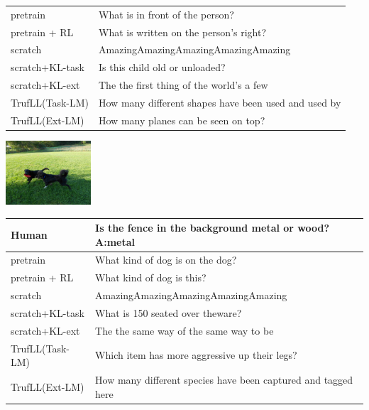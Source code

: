 \documentclass{article}
\newcommand{\algo}{TrufLL\xspace}
\begin{document}
\begin{table}[t!]
\begin{minipage}{0.85\linewidth}
\begin{tabular}{ll}
			\midrule
			pretrain        &  What is in front of the person? \\
		    pretrain + RL   & What is written on the person's right?  \\ \midrule
			scratch         & AmazingAmazingAmazingAmazingAmazing \\
			scratch+KL-task & Is this child old or unloaded? \\
			scratch+KL-ext  & The the first thing of the world’s a few \\ \midrule
			\algo(Task-LM)  & How many different shapes have been used and used by \\
			\algo(Ext-LM)   & How many planes can be seen on top? \\
			\bottomrule
		\end{tabular}
	\end{minipage}
	\vspace{1mm}
\begin{minipage}{0.2\linewidth}
		\centering
        \includegraphics[width=120px]{./COCO_val2014_000000090003.jpg}
	\end{minipage}
	\hspace{1.2cm}
	\begin{minipage}{0.85\linewidth}
	\small
		\scriptsize
		\begin{tabular}{ll}
			\toprule
			Human            & Is the fence in the background metal or wood?  \quad \textbf{A:metal} \\
			\midrule
			pretrain        &  What kind of dog is on the dog? \\
		    pretrain + RL   & What kind of dog is this?  \\ \midrule
			scratch         & AmazingAmazingAmazingAmazingAmazing \\
			scratch+KL-task & What is 150 seated over theware? \\
			scratch+KL-ext  & The the same way of the same way to be \\ \midrule
			\algo(Task-LM)  & Which item has more aggressive up their legs? \\
			\algo(Ext-LM)   & How many different species have been captured and tagged here \\
			\bottomrule
		\end{tabular}
	\end{minipage}
	

\end{table}
\end{document}
